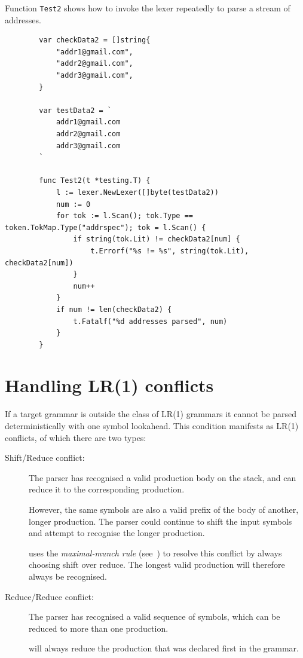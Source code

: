 \documentclass[12pt]{article}
\begin{document}
	Function \verb|Test2| shows how to invoke the lexer repeatedly to parse a stream of addresses.

	\begin{verbatim}
		var checkData2 = []string{
		    "addr1@gmail.com",
		    "addr2@gmail.com",
		    "addr3@gmail.com",
		}

		var testData2 = `
		    addr1@gmail.com
		    addr2@gmail.com
		    addr3@gmail.com
		`

		func Test2(t *testing.T) {
		    l := lexer.NewLexer([]byte(testData2))
		    num := 0
		    for tok := l.Scan(); tok.Type == token.TokMap.Type("addrspec"); tok = l.Scan() {
		        if string(tok.Lit) != checkData2[num] {
		            t.Errorf("%s != %s", string(tok.Lit), checkData2[num])
		        }
		        num++
		    }
		    if num != len(checkData2) {
		        t.Fatalf("%d addresses parsed", num)
		    }
		}
	\end{verbatim}

\section{Handling LR(1) conflicts} \label{sec:lr conflicts}
	If a target grammar is outside the class of LR(1) grammars it cannot be parsed deterministically with one symbol lookahead. This condition manifests as LR(1) conflicts, of which there are two types:

	\begin{description}
		\item[Shift/Reduce conflict:] The parser has recognised a valid production body on the stack, and can reduce it to the corresponding production. 

		However, the same symbols are also a valid prefix of the body of another, longer production. The parser could continue to shift the input symbols and attempt to recognise the longer production.

		\gocc uses the {\em maximal-munch rule} (see~\cite{Modern Compiler Design}) to resolve this conflict by always choosing shift over reduce. The longest valid production will therefore always be recognised.

		\item[Reduce/Reduce conflict:] The parser has recognised a valid sequence of symbols, which can be reduced to more than one production.

		\gocc will always reduce the production that was declared first in the grammar.
	\end{description}
\end{document}
